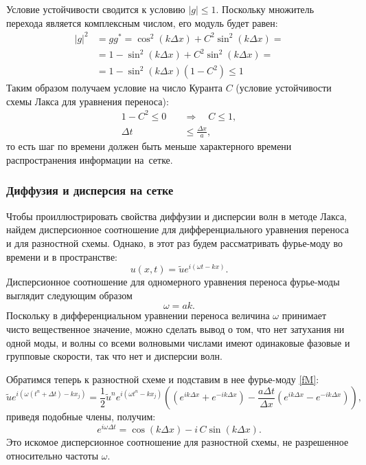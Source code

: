 \documentclass[12pt,a4paper]{article}
\begin{document}
	Условие устойчивости сводится к условию $|g| \le 1$. Поскольку множитель перехода является комплексным числом, его модуль будет равен:
	\begin{align}
		|g|^2 &= gg^* = \cos^2{(k \Delta x)} + C^2\sin^2{(k \Delta x)} =\\ 
		& = 1 - \sin^2{(k \Delta x)} + C^2\sin^2{(k \Delta x)} =\\
		& = 1 - \sin^2{(k \Delta x)}\left( 1 - C^2\right) \le 1
	\end{align}
	Таким образом получаем условие на число Куранта $C$ (условие устойчивости схемы Лакса для уравнения переноса):
	\begin{align}
		1 - C^2 \leq 0 \quad &\Rightarrow \quad C \leq 1,\label{C_laks}\\
		\Delta t &\leq \frac{\Delta x}{a},
	\end{align}
	то есть шаг по времени должен быть меньше характерного времени распространения информации на~сетке.
	
	\subsubsection{Диффузия и дисперсия на сетке}
	Чтобы проиллюстрировать свойства диффузии и дисперсии волн в методе Лакса, найдем дисперсионное соотношение для дифференциального уравнения переноса и для разностной схемы. Однако, в этот раз будем рассматривать фурье-моду во времени и в пространстве:
	\begin{equation}\label{fM}
		u(x,t) = \widetilde{u} e^{i(\omega t - kx)}.
	\end{equation}
	Дисперсионное соотношение для одномерного уравнения переноса фурье-моды выглядит следующим образом
	\begin{equation}
		\omega = a k.
	\end{equation}
	Поскольку в дифференциальном уравнении переноса величина $\omega$ принимает чисто вещественное значение, можно сделать вывод о том, что нет затухания ни одной моды, и волны со всеми волновыми числами имеют одинаковые фазовые и групповые скорости, так что нет и дисперсии волн.
	
	Обратимся теперь к разностной схеме и подставим в нее фурье-моду \eqref{fM}:
	\begin{equation}
		\widetilde{u} e^{i(\omega(t^n + \Delta t) - kx_j)} = \frac{1}{2}\widetilde{u}^{n} e^{i(\omega t^n - kx_j)} \left(\left( e^{ik\Delta x} + e^{-ik\Delta x}\right) - \frac{a \Delta t}{\Delta x}\left(e^{ik\Delta x} - e^{-ik\Delta x}\right)\right),
	\end{equation}
	приведя подобные члены, получим:
	\begin{equation} \label{DR}
		e^{i\omega \Delta t} = \cos{(k\Delta x)} - i\,C \sin{(k\Delta x)}.
	\end{equation}
	Это искомое дисперсионное соотношение для разностной схемы, не разрешенное относительно частоты $\omega$.
	
\end{document}

